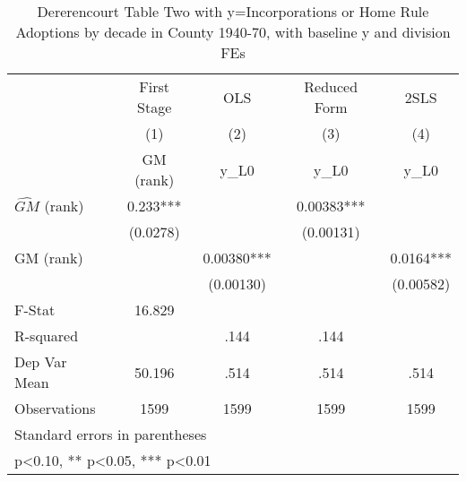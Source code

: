 \begin{table}[htbp]\centering
\def\sym#1{\ifmmode^{#1}\else\(^{#1}\)\fi}
\caption{Dererencourt Table Two with y=Incorporations or Home Rule Adoptions by decade in County 1940-70, with baseline y and division FEs}
\begin{tabular}{l*{4}{c}}
\toprule
                    & First Stage   &         OLS   &Reduced Form   &        2SLS   \\
                    &\multicolumn{1}{c}{(1)}&\multicolumn{1}{c}{(2)}&\multicolumn{1}{c}{(3)}&\multicolumn{1}{c}{(4)}\\
                    &\multicolumn{1}{c}{GM  (rank)}&\multicolumn{1}{c}{y\_L0}&\multicolumn{1}{c}{y\_L0}&\multicolumn{1}{c}{y\_L0}\\
\midrule
$\hat{GM}$ (rank)   &       0.233***&               &     0.00383***&               \\
                    &    (0.0278)   &               &   (0.00131)   &               \\
\addlinespace
GM  (rank)          &               &     0.00380***&               &      0.0164***\\
                    &               &   (0.00130)   &               &   (0.00582)   \\
\midrule
F-Stat              &      16.829   &               &               &               \\
R-squared           &               &        .144   &        .144   &               \\
Dep Var Mean        &      50.196   &        .514   &        .514   &        .514   \\
Observations        &        1599   &        1599   &        1599   &        1599   \\
\bottomrule
\multicolumn{5}{l}{\footnotesize Standard errors in parentheses}\\
\multicolumn{5}{l}{\footnotesize * p<0.10, ** p<0.05, *** p<0.01}\\
\end{tabular}
\end{table}
